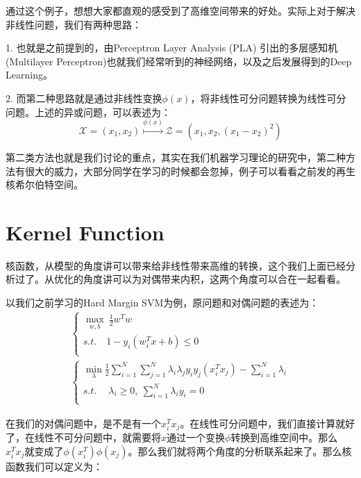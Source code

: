 \documentclass[a4paper]{article}
\begin{document}
通过这个例子，想想大家都直观的感受到了高维空间带来的好处。实际上对于解决非线性问题，我们有两种思路：

1. 也就是之前提到的，由Perceptron Layer Analysis (PLA) 引出的多层感知机 (Multilayer Perceptron)也就我们经常听到的神经网络，以及之后发展得到的Deep Learning。

2. 而第二种思路就是通过非线性变换$\phi(x)$，将非线性可分问题转换为线性可分问题。上述的异或问题，可以表述为：
\begin{equation}
    \mathcal{X}=(x_1,x_2) \stackrel{\phi(x)}{\longmapsto} \mathcal{Z}=(x_1,x_2,(x_1-x_2)^2)
\end{equation}

第二类方法也就是我们讨论的重点，其实在我们机器学习理论的研究中，第二种方法有很大的威力，大部分同学在学习的时候都会忽掉，例子可以看看之前发的再生核希尔伯特空间。

\section{Kernel Function}
核函数，从模型的角度讲可以带来给非线性带来高维的转换，这个我们上面已经分析过了。从优化的角度讲可以为对偶带来内积，这两个角度可以合在一起看看。

以我们之前学习的Hard Margin SVM为例，原问题和对偶问题的表述为：
\begin{equation}
    \begin{split}
        &\left\{
        \begin{array}{ll}
        \max_{w,b} \ \frac{1}{2} w^Tw & \\
        s.t. \quad 1-y_i(w^T_ix+b)\leq 0  & \\
        \end{array}
    \right. \\
    & \left\{
    \begin{array}{ll}
          \min_\lambda \frac{1}{2}\sum_{i=1}^N\sum_{j=1}^N\lambda_i\lambda_jy_iy_j(x_i^Tx_j) - \sum_{i=1}^N\lambda_i & \\
          s.t.\quad \ \lambda_i \geq 0,\ \sum_{i=1}^N \lambda_iy_i = 0  & \\
    \end{array}
    \right.
    \end{split}
\end{equation}

在我们的对偶问题中，是不是有一个$x_i^Tx_j$。在线性可分问题中，我们直接计算就好了，在线性不可分问题中，就需要将$x$通过一个变换$\phi$转换到高维空间中。那么$x_i^Tx_j$就变成了$\phi(x_i^T)\phi(x_j)$。那么我们就将两个角度的分析联系起来了。那么核函数我们可以定义为：
\end{document}
